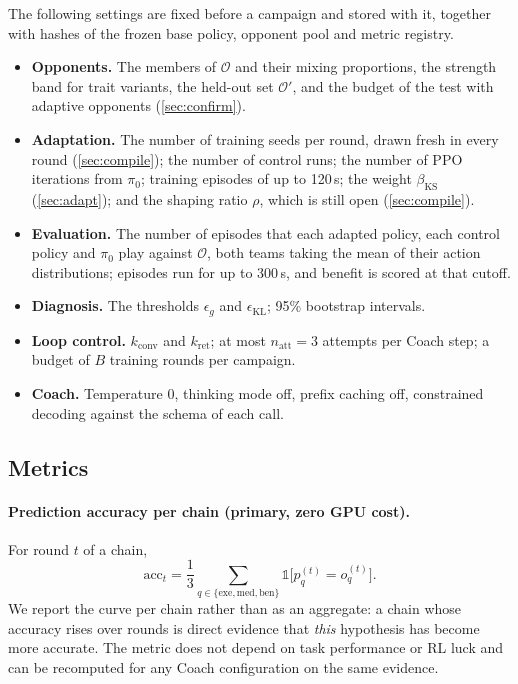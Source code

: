 \documentclass[11pt]{article}
\newcommand{\opp}{\mathcal{O}}           %
\begin{document}
The following settings are fixed before a campaign and stored with it, together with hashes of the frozen base policy, opponent pool and metric registry.
\begin{itemize}[leftmargin=*,itemsep=2pt]
  \item \textbf{Opponents.} The members of $\opp$ and their mixing proportions, the strength band for trait variants, the held-out set $\opp'$, and the budget of the test with adaptive opponents (\cref{sec:confirm}).
  \item \textbf{Adaptation.} The number of training seeds per round, drawn fresh in every round (\cref{sec:compile}); the number of control runs; the number of PPO iterations from $\pi_0$; training episodes of up to 120\,s; the weight $\beta_{\mathrm{KS}}$ (\cref{sec:adapt}); and the shaping ratio $\rho$, which is still open (\cref{sec:compile}).
  \item \textbf{Evaluation.} The number of episodes that each adapted policy, each control policy and $\pi_0$ play against $\opp$, both teams taking the mean of their action distributions; episodes run for up to 300\,s, and benefit is scored at that cutoff.
  \item \textbf{Diagnosis.} The thresholds $\epsilon_g$ and $\epsilon_{\mathrm{KL}}$; 95\% bootstrap intervals.
  \item \textbf{Loop control.} $k_{\mathrm{conv}}$ and $k_{\mathrm{ret}}$; at most $n_{\mathrm{att}} = 3$ attempts per Coach step; a budget of $B$ training rounds per campaign.
  \item \textbf{Coach.} Temperature 0, thinking mode off, prefix caching off, constrained decoding against the schema of each call.
\end{itemize}

\subsection{Metrics}
\label{sec:metrics}

\paragraph{Prediction accuracy per chain (primary, zero GPU cost).}
For round $t$ of a chain,
\begin{equation}
  \mathrm{acc}_t = \frac{1}{3}\sum_{q\in\{\mathrm{exe},\mathrm{med},\mathrm{ben}\}} \mathbb{1}\bigl[p_q^{(t)} = o_q^{(t)}\bigr].
\end{equation}
We report the curve per chain rather than as an aggregate: a chain whose accuracy rises over rounds is direct evidence that \emph{this} hypothesis has become more accurate.
The metric does not depend on task performance or RL luck and can be recomputed for any Coach configuration on the same evidence.
\end{document}
